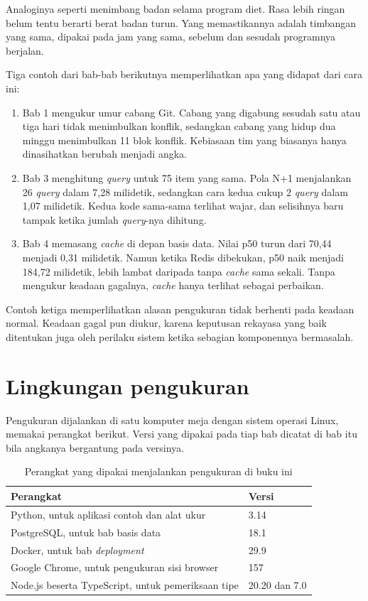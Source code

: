 Analoginya seperti menimbang badan selama program diet. Rasa lebih ringan
belum tentu berarti berat badan turun. Yang memastikannya adalah timbangan
yang sama, dipakai pada jam yang sama, sebelum dan sesudah programnya
berjalan.

Tiga contoh dari bab-bab berikutnya memperlihatkan apa yang didapat dari cara
ini:
\begin{enumerate}
  \item Bab 1 mengukur umur cabang Git. Cabang yang digabung sesudah satu
        atau tiga hari tidak menimbulkan konflik, sedangkan cabang yang hidup
        dua minggu menimbulkan 11 blok konflik. Kebiasaan tim yang biasanya
        hanya dinasihatkan berubah menjadi angka.
  \item Bab 3 menghitung \textit{query} untuk 75 item yang sama. Pola N+1
        menjalankan 26 \textit{query} dalam 7,28 milidetik, sedangkan cara
        kedua cukup 2 \textit{query} dalam 1,07 milidetik. Kedua kode
        sama-sama terlihat wajar, dan selisihnya baru tampak ketika jumlah
        \textit{query}-nya dihitung.
  \item Bab 4 memasang \textit{cache} di depan basis data. Nilai p50 turun
        dari 70,44 menjadi 0,31 milidetik. Namun ketika Redis dibekukan, p50
        naik menjadi 184,72 milidetik, lebih lambat daripada tanpa
        \textit{cache} sama sekali. Tanpa mengukur keadaan gagalnya,
        \textit{cache} hanya terlihat sebagai perbaikan.
\end{enumerate}

Contoh ketiga memperlihatkan alasan pengukuran tidak berhenti pada keadaan
normal. Keadaan gagal pun diukur, karena keputusan rekayasa yang baik
ditentukan juga oleh perilaku sistem ketika sebagian komponennya bermasalah.

\section*{Lingkungan pengukuran}

Pengukuran dijalankan di satu komputer meja dengan sistem operasi Linux,
memakai perangkat berikut. Versi yang dipakai pada tiap bab dicatat di bab
itu bila angkanya bergantung pada versinya.

\begin{table}[!htb]
  \centering
  \caption{Perangkat yang dipakai menjalankan pengukuran di buku ini}
  \label{tab:lingkungan}
  \begin{tabularx}{\textwidth}{Xl}
    \hline
    \textbf{Perangkat} & \textbf{Versi} \\
    \hline
    Python, untuk aplikasi contoh dan alat ukur & 3.14 \\
    \hline
    PostgreSQL, untuk bab basis data & 18.1 \\
    \hline
    Docker, untuk bab \textit{deployment} & 29.9 \\
    \hline
    Google Chrome, untuk pengukuran sisi browser & 157 \\
    \hline
    Node.js beserta TypeScript, untuk pemeriksaan tipe & 20.20 dan 7.0 \\
    \hline
  \end{tabularx}
\end{table}


